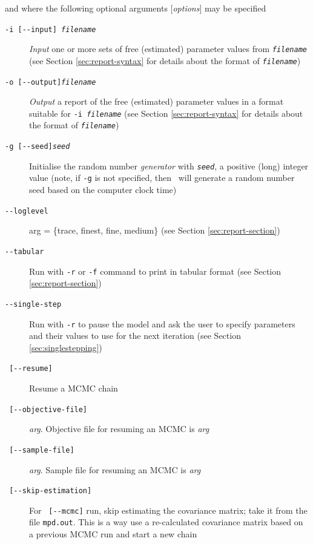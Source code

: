 and where the following optional arguments [\emph{options}] may be specified

\begin{description}
\item [\texttt{-i [-{}-input] \emph{filename}}] \emph{Input} one or more sets of free (estimated) parameter values from \texttt{\emph{filename}} (see Section \ref{sec:report-syntax} for details about the format of \texttt{\emph{filename}})

\item [\texttt{-o [-{}-output]\emph{filename}}] \emph{Output} a report of the free (estimated) parameter values in a format suitable for \texttt{-i \emph{filename}} (see Section \ref{sec:report-syntax} for details about the format of \texttt{\emph{filename}})

\item [\texttt{-g [-{}-seed]\emph{seed}}] Initialise the random number \emph{generator} with \texttt{\emph{seed}}, a positive (long) integer value (note, if \texttt{-g} is not specified, then \CNAME~will  generate a random number seed based on the computer clock time)

\item [\texttt{-{}-loglevel}] arg = \{trace, finest, fine, medium\} (see Section \ref{sec:report-section})

\item [\texttt{-{}-tabular}] Run with \texttt{-r} or \texttt{-f}  command to print  in tabular format (see Section \ref{sec:report-section})

\item [\texttt{-{}-single-step}] Run with \texttt{-r} to pause the model and ask the user to specify parameters and their values to use for the next iteration (see Section \ref{sec:singlestepping})

\item [\texttt{   [-{}-resume] }] Resume a MCMC chain

\item [\texttt{   [-{}-objective-file] }] \emph{arg}. Objective file for resuming an MCMC is \emph{arg}

\item [\texttt{   [-{}-sample-file] }] \emph{arg}. Sample file for resuming an MCMC is \emph{arg}

\item [\texttt{   [-{}-skip-estimation] }] For \texttt{   [-{}-mcmc]} run, skip estimating the covariance matrix; take it from the file \texttt{mpd.out}. This is a way use a re-calculated covariance matrix based on a previous MCMC run and start a new chain


\end{description}
